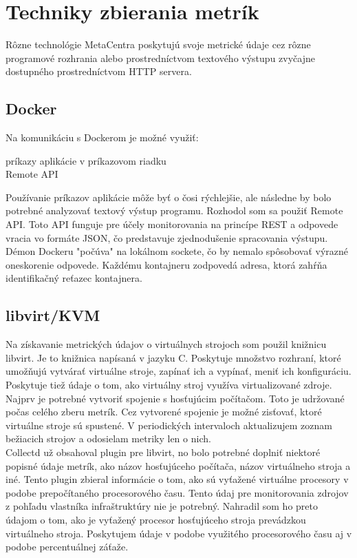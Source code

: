 \documentclass[12pt,twoside,color,cover,table]{fithesis3}
\begin{document}
\section{Techniky zbierania metrík}
Rôzne technológie MetaCentra poskytujú svoje metrické údaje cez rôzne programové rozhrania alebo prostredníctvom textového výstupu zvyčajne
dostupného prostredníctvom HTTP servera.

\subsection{Docker}
Na komunikáciu s Dockerom je možné využiť:
\begin{description}
\item[príkazy aplikácie v príkazovom riadku]
\item[Remote API]
\end{description}

Používanie príkazov aplikácie môže byť o čosi rýchlejšie, ale následne by bolo potrebné analyzovať textový výstup programu.
Rozhodol som sa použiť Remote API. Toto API funguje pre účely monitorovania na princípe REST a odpovede vracia vo formáte JSON, čo predstavuje zjednodušenie spracovania výstupu. Démon Dockeru "počúva" na 
lokálnom sockete, čo by nemalo spôsobovať výrazné oneskorenie odpovede. Každému kontajneru zodpovedá adresa, ktorá zahŕňa identifikačný reťazec kontajnera.

\subsection{libvirt/KVM}
Na získavanie metrických údajov o virtuálnych strojoch som použil knižnicu libvirt. Je to knižnica napísaná v jazyku C. Poskytuje množstvo
rozhraní, ktoré umožňujú vytvárať virtuálne stroje, zapínať ich a vypínať, meniť ich konfiguráciu. Poskytuje tiež údaje o tom, ako virtuálny
stroj využíva virtualizované zdroje. 
\\Najprv je potrebné vytvoriť spojenie s hosťujúcim počítačom. Toto je udržované počas celého zberu metrík. Cez vytvorené spojenie
je možné zisťovať, ktoré virtuálne stroje sú spustené. V periodických intervaloch aktualizujem zoznam bežiacich strojov a odosielam
metriky len o nich.
\\Collectd už obsahoval plugin pre libvirt, no bolo potrebné doplniť niektoré popisné údaje metrík, ako názov hosťujúceho počítača,
názov virtuálneho stroja a iné. Tento plugin zbieral informácie o tom, ako sú vyťažené virtuálne procesory v podobe prepočítaného procesorového času.
Tento údaj pre monitorovania zdrojov z pohľadu vlastníka infraštruktúry nie je potrebný. Nahradil som ho preto údajom o tom, ako je vyťažený
procesor hosťujúceho stroja prevádzkou virtuálneho stroja. Poskytujem údaje v podobe využitého procesorového času aj v podobe percentuálnej záťaže.
\end{document}
